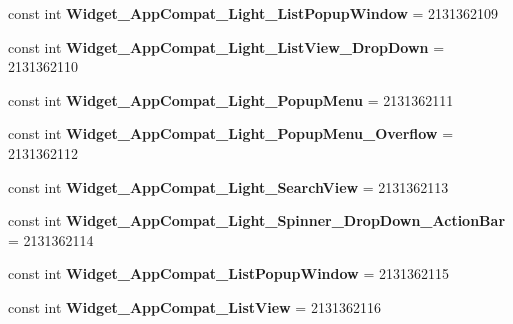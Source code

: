 \begin{DoxyCompactItemize}
const int {\bfseries Widget\+\_\+\+App\+Compat\+\_\+\+Light\+\_\+\+List\+Popup\+Window} = 2131362109
\item 
\mbox{\label{class_pinned_app_1_1_droid_1_1_resource_1_1_style_ae668b23ceadca4b35848254699aa775a}} 
const int {\bfseries Widget\+\_\+\+App\+Compat\+\_\+\+Light\+\_\+\+List\+View\+\_\+\+Drop\+Down} = 2131362110
\item 
\mbox{\label{class_pinned_app_1_1_droid_1_1_resource_1_1_style_a791b67e6968f85a8f28b902a119cbac9}} 
const int {\bfseries Widget\+\_\+\+App\+Compat\+\_\+\+Light\+\_\+\+Popup\+Menu} = 2131362111
\item 
\mbox{\label{class_pinned_app_1_1_droid_1_1_resource_1_1_style_ae1d06988ff902eb3e8d1d3f7f6783f1e}} 
const int {\bfseries Widget\+\_\+\+App\+Compat\+\_\+\+Light\+\_\+\+Popup\+Menu\+\_\+\+Overflow} = 2131362112
\item 
\mbox{\label{class_pinned_app_1_1_droid_1_1_resource_1_1_style_a92767a0a75c981439d96c742f8d7d5a2}} 
const int {\bfseries Widget\+\_\+\+App\+Compat\+\_\+\+Light\+\_\+\+Search\+View} = 2131362113
\item 
\mbox{\label{class_pinned_app_1_1_droid_1_1_resource_1_1_style_a5b99811e73600b0254ed30ed9d6df6ed}} 
const int {\bfseries Widget\+\_\+\+App\+Compat\+\_\+\+Light\+\_\+\+Spinner\+\_\+\+Drop\+Down\+\_\+\+Action\+Bar} = 2131362114
\item 
\mbox{\label{class_pinned_app_1_1_droid_1_1_resource_1_1_style_a85f9c1f7b0dc0d493ad88c556c3d8efd}} 
const int {\bfseries Widget\+\_\+\+App\+Compat\+\_\+\+List\+Popup\+Window} = 2131362115
\item 
\mbox{\label{class_pinned_app_1_1_droid_1_1_resource_1_1_style_a5493babf22b34fb7b0730db7e5a3ff8a}} 
const int {\bfseries Widget\+\_\+\+App\+Compat\+\_\+\+List\+View} = 2131362116
\item 
\mbox{\label{class_pinned_app_1_1_droid_1_1_resource_1_1_style_ace7857cd1ad4f8e193dd4dd1d09e6f96}} 

\end{DoxyCompactItemize}
